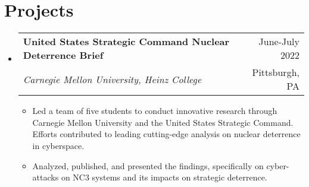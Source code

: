 \documentclass[letterpaper,11pt]{article}
\makeatletter
\newcommand{\myuline}[1]{%
  \uline{\phantom{#1}}%
  \llap{\contour{white}{#1}}%
}
\newcommand{\resumeItem}[1]{
  \item\small{
    {#1 \vspace{-1pt}}
  }
}
\newcommand{\resumeSubheading}[4]{
  \vspace{-1pt}\item
    \begin{tabular*}{\textwidth}[t]{l@{\extracolsep{\fill}}r}
      \textbf{#1} & {\color{dark-grey}\small #2}\vspace{1pt}\\ %
      \textit{#3} & {\color{dark-grey} \small #4}\\ %
    \end{tabular*}\vspace{-4pt}
}
\newcommand{\resumeProjectHeading}[2]{
    \item
    \begin{tabular*}{\textwidth}{l@{\extracolsep{\fill}}r}
      #1 & {\color{dark-grey}} \\
    \end{tabular*}\vspace{-4pt}
}
\newcommand{\resumeSubHeadingListStart}{\begin{itemize}[leftmargin=0in, label={}]}
\newcommand{\resumeItemListStart}{\begin{itemize}}
\newcommand{\resumeItemListEnd}{\end{itemize}\vspace{0pt}}
\makeatother
\begin{document}



\section{Projects}
          
    \resumeSubHeadingListStart
          \resumeSubheading{United States Strategic Command Nuclear Deterrence Brief}{June-July 2022}{Carnegie Mellon University, Heinz College}{Pittsburgh, PA}
          
          \resumeItemListStart
            \resumeItem{Led a team of five students to conduct innovative research through Carnegie Mellon University and the United States Strategic Command. Efforts contributed to leading cutting-edge analysis on nuclear deterrence in cyberspace.}

            \resumeItem{Analyzed, published, and presented the findings, specifically on cyber-attacks on NC3 systems and its impacts on strategic deterrence.
            }
          \resumeItemListEnd
          
          \resumeItemListEnd
          
\end{document}
